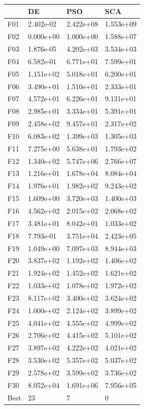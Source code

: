 \begin{tabular}{llll}
\toprule
{} &         DE &        PSO &        SCA \\
\midrule
F01  &  2.402e-02 &  2.422e+08 &  1.553e+09 \\
F02  &  0.000e+00 &  1.000e+00 &  1.588e+07 \\
F03  &  1.876e-05 &  4.202e+03 &  3.534e+03 \\
F04  &  6.582e-01 &  6.771e+01 &  7.599e+01 \\
F05  &  1.151e+02 &  5.018e+01 &  6.200e+01 \\
F06  &  3.490e+01 &  1.510e+01 &  2.333e+01 \\
F07  &  4.572e+01 &  6.226e+01 &  9.131e+01 \\
F08  &  2.985e+01 &  3.334e+01 &  5.391e+01 \\
F09  &  2.458e+02 &  9.457e+01 &  2.317e+02 \\
F10  &  6.083e+02 &  1.399e+03 &  1.305e+03 \\
F11  &  7.275e+00 &  5.638e+01 &  1.793e+02 \\
F12  &  1.340e+02 &  5.747e+06 &  2.766e+07 \\
F13  &  1.216e+01 &  1.678e+04 &  8.084e+04 \\
F14  &  1.976e+01 &  1.982e+02 &  9.243e+02 \\
F15  &  1.609e+00 &  3.720e+03 &  1.400e+03 \\
F16  &  4.562e+02 &  2.015e+02 &  2.068e+02 \\
F17  &  3.481e+01 &  8.042e+01 &  1.033e+02 \\
F18  &  7.793e-01 &  3.751e+04 &  2.423e+05 \\
F19  &  1.049e+00 &  7.097e+03 &  8.944e+03 \\
F20  &  3.837e+02 &  1.192e+02 &  1.406e+02 \\
F21  &  1.924e+02 &  1.452e+02 &  1.621e+02 \\
F22  &  1.033e+02 &  1.078e+02 &  1.972e+02 \\
F23  &  8.117e+02 &  3.400e+02 &  3.624e+02 \\
F24  &  1.000e+02 &  2.124e+02 &  3.899e+02 \\
F25  &  4.041e+02 &  4.555e+02 &  4.999e+02 \\
F26  &  2.706e+02 &  4.415e+02 &  5.101e+02 \\
F27  &  3.897e+02 &  4.222e+02 &  4.021e+02 \\
F28  &  3.530e+02 &  5.357e+02 &  5.037e+02 \\
F29  &  2.578e+02 &  3.599e+02 &  3.736e+02 \\
F30  &  8.052e+04 &  1.691e+06 &  7.956e+05 \\
Best &         23 &          7 &          0 \\
\bottomrule
\end{tabular}
